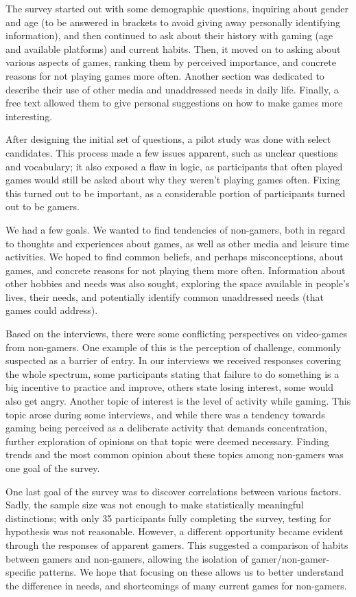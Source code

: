 \documentclass[]{vutinfth}
\begin{document}
The survey started out with some demographic questions, inquiring about
gender and age (to be answered in brackets to avoid giving away
personally identifying information), and then continued to ask about
their history with gaming (age and available platforms) and current
habits. Then, it moved on to asking about various aspects of games,
ranking them by perceived importance, and concrete reasons for not
playing games more often. Another section was dedicated to describe
their use of other media and unaddressed needs in daily life. Finally, a
free text allowed them to give personal suggestions on how to make games
more interesting.

After designing the initial set of questions, a pilot study was done
with select candidates. This process made a few issues apparent, such as
unclear questions and vocabulary; it also exposed a flaw in logic, as
participants that often played games would still be asked about why they
weren't playing games often. Fixing this turned out to be important, as
a considerable portion of participants turned out to be gamers.

We had a few goals. We wanted to find tendencies of non-gamers, both in
regard to thoughts and experiences about games, as well as other media
and leisure time activities. We hoped to find common beliefs, and
perhaps misconceptions, about games, and concrete reasons for not
playing them more often. Information about other hobbies and needs was
also sought, exploring the space available in people's lives, their
needs, and potentially identify common unaddressed needs (that games
could address).

Based on the interviews, there were some conflicting perspectives on
video-games from non-gamers. One example of this is the perception of
challenge, commonly suspected as a barrier of entry. In our interviews
we received responses covering the whole spectrum, some participants
stating that failure to do something is a big incentive to practice and
improve, others state losing interest, some would also get angry.
Another topic of interest is the level of activity while gaming. This
topic arose during some interviews, and while there was a tendency
towards gaming being perceived as a deliberate activity that demands
concentration, further exploration of opinions on that topic were deemed
necessary. Finding trends and the most common opinion about these topics
among non-gamers was one goal of the survey.

One last goal of the survey was to discover correlations between various
factors. Sadly, the sample size was not enough to make statistically
meaningful distinctions; with only 35 participants fully completing the
survey, testing for hypothesis was not reasonable. However, a different
opportunity became evident through the responses of apparent gamers.
This suggested a comparison of habits between gamers and non-gamers,
allowing the isolation of gamer/non-gamer-specific patterns. We hope
that focusing on these allows us to better understand the difference in
needs, and shortcomings of many current games for non-gamers.
\end{document}
